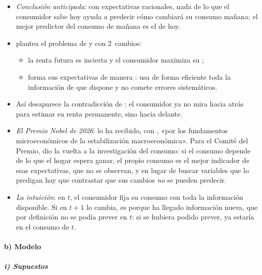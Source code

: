 \documentclass[11pt]{article}
\begin{document}
\begin{itemize}
\item \emph{Conclusión anticipada}: con expectativas racionales, nada de lo que el consumidor sabe hoy ayuda a predecir cómo cambiará su consumo mañana: el mejor predictor del consumo de mañana es el de hoy.
\item \textcite{Hall1978} plantea el problema de  y  con 2~cambios:
  \begin{itemize}
  \item la renta futura es incierta y el consumidor maximiza su  ;
  \item forma sus expectativas de manera  : usa de forma eficiente toda la información de que dispone y no comete errores sistemáticos.
  \end{itemize}
\item Así desaparece la contradicción de : el consumidor ya no mira hacia atrás para estimar su renta permanente, sino hacia delante.
\item \emph{El Premio Nobel de 2026}:  lo ha recibido, con , «por los fundamentos microeconómicos de la estabilización macroeconómica». Para el Comité del Premio,  dio la vuelta a la investigación del consumo: si el consumo depende de lo que el hogar espera ganar, el propio consumo es el mejor indicador de esas expectativas, que no se observan, y en lugar de buscar variables que lo predigan hay que contrastar que sus cambios \emph{no} se pueden predecir\nocite{Nobel2026Prensa,Nobel2026Divulgacion}.
\item \emph{La intuición}: en $t$, el consumidor fija su consumo con toda la información disponible. Si en $t+1$ lo cambia, es porque ha llegado información nueva, que por definición no se podía prever en $t$: si se hubiera podido prever, ya estaría en el consumo de $t$.
\end{itemize}

\paragraph{b) Modelo}

\subparagraph{i) Supuestos}
\end{document}
